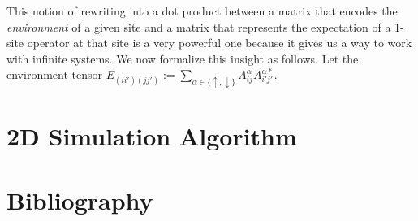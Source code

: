 \documentclass{article}
\begin{document}
This notion of rewriting into a dot product between a matrix that encodes the \emph{environment} of a given site and a matrix that represents the expectation of a 1-site operator at that site is a very powerful one because it gives us a way to work with infinite systems.  We now formalize this insight as follows.  Let the environment tensor $E_{(ii')(jj')}:=\sum_{\alpha\in\{\uparrow,\downarrow\}}A^\alpha_{ij}A^{\alpha*}_{i'j'}.$

\part{2D Simulation Algorithm}
\label{2dsim}

\part*{Bibliography}



\end{document}
